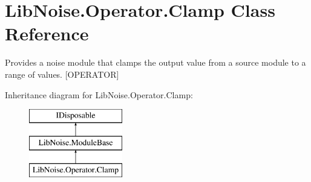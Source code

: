 \hypertarget{class_lib_noise_1_1_operator_1_1_clamp}{}\section{Lib\+Noise.\+Operator.\+Clamp Class Reference}
\label{class_lib_noise_1_1_operator_1_1_clamp}


Provides a noise module that clamps the output value from a source module to a range of values. \mbox{[}O\+P\+E\+R\+A\+T\+OR\mbox{]}  


Inheritance diagram for Lib\+Noise.\+Operator.\+Clamp\+:\begin{figure}[H]
\begin{center}
\leavevmode
\includegraphics[height=3.000000cm]{class_lib_noise_1_1_operator_1_1_clamp}
\end{center}
\end{figure}
